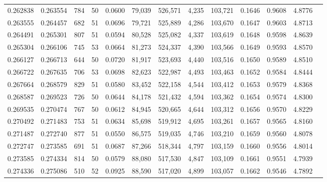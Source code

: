 \begin{tabular}{rrrrrrrrrrrrr}
0.262838 & 0.263554 &   784 &  50 &                                     0.0600 &  79,039 & 526,571 &   4,235 & 103,721 & 0.1646 & 0.9608 & 4.8776 \\
0.263555 & 0.264457 &   682 &  51 &                                     0.0696 &  79,721 & 525,889 &   4,286 & 103,670 & 0.1647 & 0.9603 & 4.8713 \\
0.264491 & 0.265301 &   807 &  51 &                                     0.0594 &  80,528 & 525,082 &   4,337 & 103,619 & 0.1648 & 0.9598 & 4.8639 \\
0.265304 & 0.266106 &   745 &  53 &                                     0.0664 &  81,273 & 524,337 &   4,390 & 103,566 & 0.1649 & 0.9593 & 4.8570 \\
0.266127 & 0.266713 &   644 &  50 &                                     0.0720 &  81,917 & 523,693 &   4,440 & 103,516 & 0.1650 & 0.9589 & 4.8510 \\
0.266722 & 0.267635 &   706 &  53 &                                     0.0698 &  82,623 & 522,987 &   4,493 & 103,463 & 0.1652 & 0.9584 & 4.8444 \\
0.267664 & 0.268579 &   829 &  51 &                                     0.0580 &  83,452 & 522,158 &   4,544 & 103,412 & 0.1653 & 0.9579 & 4.8368 \\
0.268587 & 0.269523 &   726 &  50 &                                     0.0644 &  84,178 & 521,432 &   4,594 & 103,362 & 0.1654 & 0.9574 & 4.8300 \\
0.269535 & 0.270474 &   767 &  50 &                                     0.0612 &  84,945 & 520,665 &   4,644 & 103,312 & 0.1656 & 0.9570 & 4.8229 \\
0.270492 & 0.271483 &   753 &  51 &                                     0.0634 &  85,698 & 519,912 &   4,695 & 103,261 & 0.1657 & 0.9565 & 4.8160 \\
0.271487 & 0.272740 &   877 &  51 &                                     0.0550 &  86,575 & 519,035 &   4,746 & 103,210 & 0.1659 & 0.9560 & 4.8078 \\
0.272747 & 0.273585 &   691 &  51 &                                     0.0687 &  87,266 & 518,344 &   4,797 & 103,159 & 0.1660 & 0.9556 & 4.8014 \\
0.273585 & 0.274334 &   814 &  50 &                                     0.0579 &  88,080 & 517,530 &   4,847 & 103,109 & 0.1661 & 0.9551 & 4.7939 \\
0.274336 & 0.275086 &   510 &  52 &                                     0.0925 &  88,590 & 517,020 &   4,899 & 103,057 & 0.1662 & 0.9546 & 4.7892 \\

\end{tabular}
